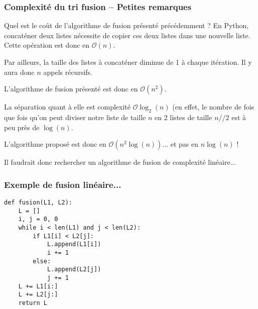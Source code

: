 \subsubsection{Complexité du tri fusion -- Petites remarques}

Quel est le coût de l'algorithme de fusion présenté précédemment ?
En Python, concaténer deux listes nécessite de copier ces deux listes dans une nouvelle liste. Cette opération est donc en $\mathcal{O}(n)$. 

Par ailleurs, la taille des listes à concaténer diminue de 1 à chaque itération. Il y aura donc $n$ appels récursifs. 

L'algorithme de fusion présenté est donc en $\mathcal{O}(n^2)$.

La séparation quant à elle est complexité $\mathcal{O}\log_2(n)$ (en effet, le nombre de fois que fois qu'on peut diviser notre liste de taille $n$ en 2 listes de taille $n//2$ est à peu près de $\log(n)$.

L'algorithme proposé est donc en $\mathcal{O}\left(n^2 \log(n)\right)$... et pas en $n\log(n)$ !

Il faudrait donc rechercher un algorithme de fusion de complexité linéaire...
\subsubsection{Exemple de fusion linéaire...}
\begin{lstlisting}
def fusion(L1, L2):
    L = []
    i, j = 0, 0
    while i < len(L1) and j < len(L2):
        if L1[i] < L2[j]:
            L.append(L1[i])
            i += 1
        else:
            L.append(L2[j])
            j += 1
    L += L1[i:]
    L += L2[j:]
    return L
\end{lstlisting}


